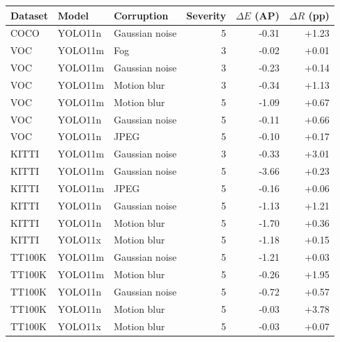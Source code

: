 \begin{tabular}{lllrrr}
\toprule
Dataset & Model & Corruption & Severity & $\Delta E$ (AP) & $\Delta R$ (pp) \\
\midrule
COCO & YOLO11n & Gaussian noise & 5 & -0.31 & +1.23 \\
VOC & YOLO11m & Fog & 3 & -0.02 & +0.01 \\
VOC & YOLO11m & Gaussian noise & 3 & -0.23 & +0.14 \\
VOC & YOLO11m & Motion blur & 3 & -0.34 & +1.13 \\
VOC & YOLO11m & Motion blur & 5 & -1.09 & +0.67 \\
VOC & YOLO11n & Gaussian noise & 5 & -0.11 & +0.66 \\
VOC & YOLO11n & JPEG & 5 & -0.10 & +0.17 \\
KITTI & YOLO11m & Gaussian noise & 3 & -0.33 & +3.01 \\
KITTI & YOLO11m & Gaussian noise & 5 & -3.66 & +0.23 \\
KITTI & YOLO11m & JPEG & 5 & -0.16 & +0.06 \\
KITTI & YOLO11n & Gaussian noise & 5 & -1.13 & +1.21 \\
KITTI & YOLO11n & Motion blur & 5 & -1.70 & +0.36 \\
KITTI & YOLO11x & Motion blur & 5 & -1.18 & +0.15 \\
TT100K & YOLO11m & Gaussian noise & 5 & -1.21 & +0.03 \\
TT100K & YOLO11m & Motion blur & 5 & -0.26 & +1.95 \\
TT100K & YOLO11n & Gaussian noise & 5 & -0.72 & +0.57 \\
TT100K & YOLO11n & Motion blur & 5 & -0.03 & +3.78 \\
TT100K & YOLO11x & Motion blur & 5 & -0.03 & +0.07 \\
\bottomrule
\end{tabular}
